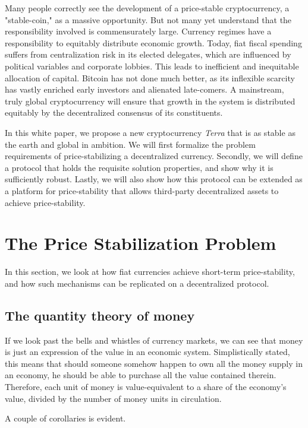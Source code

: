 \documentclass{article}
\begin{document}
Many people correctly see the development of a price-stable cryptocurrency, a "stable-coin," as a massive opportunity. But not many yet understand that the responsibility involved is commensurately large. Currency regimes have a responsibility to equitably distribute economic growth. Today, fiat fiscal spending suffers from centralization risk in its elected delegates, which are influenced by political variables and corporate lobbies. This leads to inefficient and inequitable allocation of capital. Bitcoin has not done much better, as its inflexible scarcity has vastly enriched early investors and alienated late-comers. A mainstream, truly global cryptocurrency will ensure that growth in the system is distributed equitably by the decentralized consensus of its constituents. 

In this white paper, we propose a new cryptocurrency \textit{Terra} that is as stable as the earth and global in ambition. We will first formalize the problem requirements of price-stabilizing a decentralized currency. Secondly, we will define a protocol that holds the requisite solution properties, and show why it is sufficiently robust. Lastly, we will also show how this protocol can be extended as a platform for price-stability that allows third-party decentralized assets to achieve price-stability. 

\section{The Price Stabilization Problem}

In this section, we look at how fiat currencies achieve short-term price-stability, and how such mechanisms can be replicated on a decentralized protocol. 

\subsection{The quantity theory of money}

If we look past the bells and whistles of currency markets, we can see that money is just an expression of the value in an economic system. Simplistically stated, this means that should someone somehow happen to own all the money supply in an economy, he should be able to purchase all the value contained therein. Therefore, each unit of money is value-equivalent to a share of the economy's value, divided by the number of money units in circulation.  

A couple of corollaries is evident. 
\end{document}
